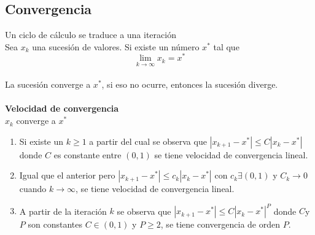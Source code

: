 \subsection{Convergencia} 
Un ciclo de c\'alculo se traduce a una iteraci\'on 
\\
Sea $x_k$ una sucesi\'on de valores. Si existe un n\'umero $x^*$ tal que $$\lim\limits_{k\to\infty}x_k=x^*$$ \\
La sucesi\'on converge a $x^*$, si eso no ocurre, entonces la sucesi\'on diverge.
\\ \\ 
\textbf{Velocidad de convergencia}\\ 
${x_k}$ converge a $x^*$ \\
\begin{enumerate}
\item Si existe un $k\geq 1$ a partir del cual se observa que $|x_{k+1}-x^*|\leq C|x_k-x^*|$ donde $C$ es constante entre $(0,1)$ se tiene velocidad de convergencia lineal.
\item Igual que el anterior pero $|x_{k+1}-x^*|\leq c_k|x_k-x^*|$ con $c_k\exists(0,1)$ y $C_k\to0$ cuando $k\to\infty$, se tiene  velocidad de convergencia lineal.
\item A partir de la iteraci\'on $k$ se observa que $|x_{k+1}-x^*|\leq C{|x_k-x^*|}^P$ donde $C$y $P$ son constantes $C\in(0,1)$ y $P\geq2$, se tiene convergencia de orden $P$.
\end{enumerate}

